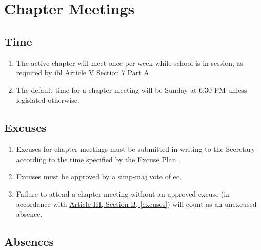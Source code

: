 \chapter{Chapter Meetings}

\section{Time}

	\begin{enumerate}
		\item The active chapter will meet once per week while school is in session, as required by \gls{ibl} Article V Section 7 Part A. 

		\item The default time for a chapter meeting will be Sunday at 6:30 PM unless legislated otherwise.

	\end{enumerate}

\section{Excuses}

	\begin{enumerate}
		\item Excuses for chapter meetings must be submitted in writing to the
		Secretary according to the time specified by the Excuse Plan. \label{excuses}

		\item Excuses must be approved by a \gls{simp-maj} vote of \gls{ec}. %

		\item Failure to \gls{attend} a chapter meeting without an approved excuse (in accordance with \hyperref[excuses]{Article III, Section B, \autoref*{excuses}}) will count as an unexcused absence.

	\end{enumerate}

\section{Absences}
	\label{attendance}

